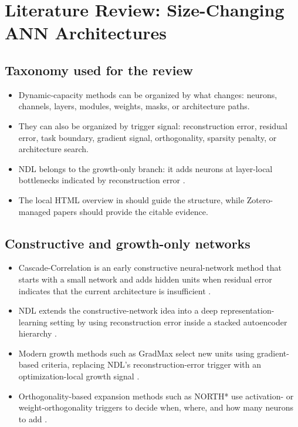 \section{Literature Review: Size-Changing ANN Architectures}

\subsection{Taxonomy used for the review}
\begin{itemize}
  \item Dynamic-capacity methods can be organized by what changes: neurons, channels, layers, modules, weights, masks, or architecture paths.
  \item They can also be organized by trigger signal: reconstruction error, residual error, task boundary, gradient signal, orthogonality, sparsity penalty, or architecture search.
  \item NDL belongs to the growth-only branch: it adds neurons at layer-local bottlenecks indicated by reconstruction error \parencite{draelos2017neurogenesis}.
  \item The local HTML overview in  should guide the structure, while Zotero-managed papers should provide the citable evidence.
\end{itemize}

\subsection{Constructive and growth-only networks}
\begin{itemize}
  \item Cascade-Correlation is an early constructive neural-network method that starts with a small network and adds hidden units when residual error indicates that the current architecture is insufficient \parencite{fahlman1990cascade}.
  \item NDL extends the constructive-network idea into a deep representation-learning setting by using reconstruction error inside a stacked autoencoder hierarchy \parencite{draelos2017neurogenesis}.
  \item Modern growth methods such as GradMax select new units using gradient-based criteria, replacing NDL's reconstruction-error trigger with an optimization-local growth signal \parencite{evci2022gradmax}.
  \item Orthogonality-based expansion methods such as NORTH* use activation- or weight-orthogonality triggers to decide when, where, and how many neurons to add \parencite{maile2022north}.
\end{itemize}

